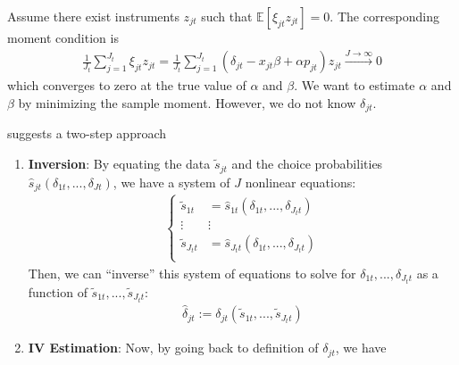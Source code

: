 \documentclass[11pt]{elegantbook}
\begin{document}
Assume there exist instruments $z_{jt}$ such that $\mathbb{E}[\xi_{jt}z_{jt}]=0$. The corresponding moment condition is
\begin{equation}
    \begin{aligned}
        \frac{1}{J_t}\sum_{j=1}^{J_t}\xi_{jt}z_{jt}=\frac{1}{J_t}\sum_{j=1}^{J_t}\left(\delta_{jt}-x_{jt}\beta+\alpha p_{jt}\right)z_{jt} \stackrel{J \rightarrow \infty}{\longrightarrow} 0
    \end{aligned}
    \label{eq:iv_moment}
    \tag{Sample Moment}
\end{equation}
which converges to zero at the true value of $\alpha$ and $\beta$. We want to estimate $\alpha$ and $\beta$ by minimizing the sample moment. However, we do not know $\delta_{jt}$.
\begin{definition}
    \cite{berry1994estimating} suggests a two-step approach
    \begin{enumerate}
        \item \textbf{Inversion}: By equating the data $\tilde{s}_{jt}$ and the choice probabilities $\hat{s}_{jt}(\delta_{1t},...,\delta_{Jt})$, we have a system of $J$ nonlinear equations:
        \begin{equation}
            \begin{aligned}
                \left\{\begin{matrix}
                    \tilde{s}_{1t}&=\hat{s}_{1t}(\delta_{1t},...,\delta_{J_tt})\\
                    \vdots&\vdots\\
                    \tilde{s}_{J_tt}&=\hat{s}_{J_tt}(\delta_{1t},...,\delta_{J_tt})\\
                \end{matrix}\right.
            \end{aligned}
            \nonumber
        \end{equation}
        Then, we can ``inverse'' this system of equations to solve for $\delta_{1t},...,\delta_{J_tt}$ as a function of $\tilde{s}_{1t},...,\tilde{s}_{J_tt}$:
        \begin{equation}
            \begin{aligned}
                \hat{\delta}_{jt}:=\delta_{jt}(\tilde{s}_{1t},...,\tilde{s}_{J_tt})
            \end{aligned}
            \label{eq:inversion}
        \end{equation}
        \item \textbf{IV Estimation}: Now, by going back to definition of $\delta_{jt}$, we have

\end{enumerate}
\end{definition}
\end{document}
